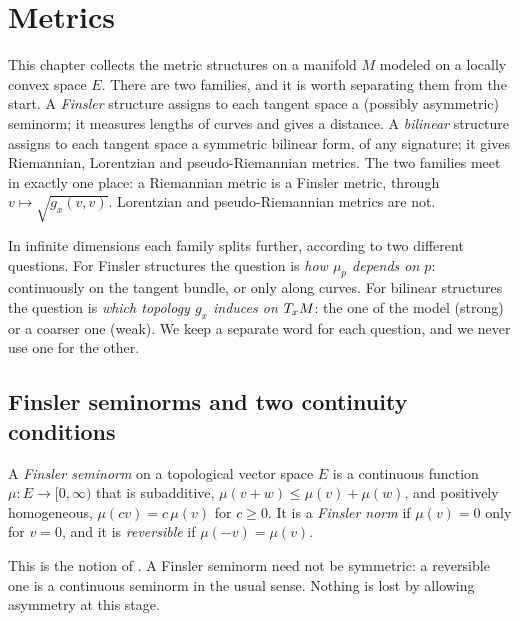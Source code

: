 \chapter{Metrics}
\label{chap:metrics}

This chapter collects the metric structures on a manifold $M$ modeled on a locally convex space
$E$. There are two families, and it is worth separating them from the start. A \emph{Finsler}
structure assigns to each tangent space a (possibly asymmetric) seminorm; it measures lengths of
curves and gives a distance. A \emph{bilinear} structure assigns to each tangent space a symmetric
bilinear form, of any signature; it gives Riemannian, Lorentzian and pseudo-Riemannian metrics.
The two families meet in exactly one place: a Riemannian metric is a Finsler metric, through
$v \mapsto \sqrt{g_x(v,v)}$. Lorentzian and pseudo-Riemannian metrics are not.

In infinite dimensions each family splits further, according to two different questions. For
Finsler structures the question is \emph{how $\mu_p$ depends on $p$}: continuously on the tangent
bundle, or only along curves. For bilinear structures the question is \emph{which topology $g_x$
induces on $T_x M$}: the one of the model (strong) or a coarser one (weak). We keep a separate
word for each question, and we never use one for the other.

\section{Finsler seminorms and two continuity conditions}

\begin{definition}
  \label{def:finsler-seminorm}
  \leanok
  A \emph{Finsler seminorm} on a topological vector space $E$ is a continuous function
  $\mu \colon E \to [0, \infty)$ that is subadditive, $\mu(v + w) \le \mu(v) + \mu(w)$, and
  positively homogeneous, $\mu(c v) = c\,\mu(v)$ for $c \ge 0$. It is a \emph{Finsler norm} if
  $\mu(v) = 0$ only for $v = 0$, and it is \emph{reversible} if $\mu(-v) = \mu(v)$.
\end{definition}

This is the notion of \cite[Def.~2.2]{Lar19}. A Finsler seminorm need not be symmetric: a
reversible one is a continuous seminorm in the usual sense. Nothing is lost by allowing asymmetry
at this stage.

